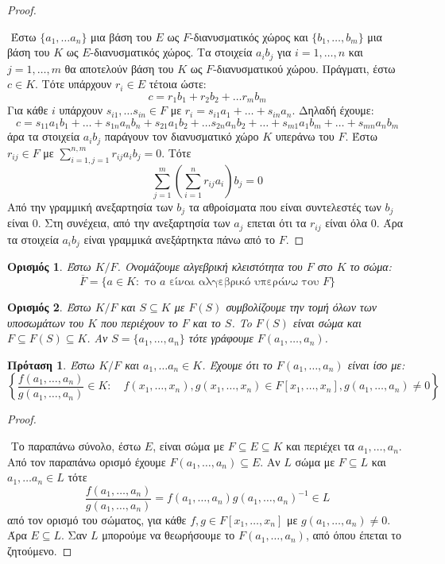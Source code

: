 \documentclass[oneside,a4paper]{article}
\newtheorem*{defn}{Ορισμός}
\newtheorem{prop}{Πρόταση}
\begin{document}
\begin{proof} $ $
	
	$ $\newline
	Έστω $\{a_1 , \ldots a_n\}$ μια βάση του $E$ ως $F$-διανυσματικός χώρος και $\{b_1,\ldots,b_m\}$ μια βάση του $K$ ως $E$-διανυσματικός χώρος. Τα στοιχεία $a_i b_j$ για $i=1,\ldots,n$ και $j=1,\ldots,m$ θα αποτελούν βάση του $K$ ως $F$-διανυσματικού χώρου. Πράγματι, έστω $c \in K$. Τότε υπάρχουν $r_i \in E$ τέτοια ώστε:
	$$c = r_1 b_1 + r_2 b_2 + \ldots r_m b_m$$
	Για κάθε $i$ υπάρχουν $s_{i1},\ldots s_{in} \in F$ με $r_i = s_{i1} a_1 + \ldots + s_{in} a_n$. Δηλαδή έχουμε:
	$$c = s_{11} a_1 b_1 + \ldots + s_{1n} a_n b_n + s_{21} a_1 b_2 + \ldots s_{2n} a_n b_2 + \ldots +s_{m1} a_1 b_m + \ldots + s_{mn} a_n b_m$$
	άρα τα στοιχεία $a_i b_j$ παράγουν τον διανυσματικό χώρο $K$ υπεράνω του $F$.
	Έστω $r_{ij} \in F$ με $\sum\limits_{i=1,j=1}^{n,m} r_{ij} a_i b_j = 0$. Τότε
	$$\sum\limits_{j=1}^m \left(\sum\limits_{i=1}^n r_{ij} a_i \right) b_j = 0$$
	Από την γραμμική ανεξαρτησία των $b_j$ τα αθροίσματα που είναι συντελεστές των $b_j$ είναι $0$. Στη συνέχεια, από την ανεξαρτησία των $a_j$ επεται ότι τα $r_{ij}$ είναι όλα $0$. Άρα τα στοιχεία $a_i b_j$ είναι γραμμικά ανεξάρτηκτα πάνω από το $F$.
\end{proof}
\vspace{0.1cm}
\begin{defn} Έστω $K/F$. Ονομάζουμε αλγεβρική κλειστότητα του $F$ στο $K$ το σώμα:
	$$\overline F = \{a \in K: \text{ το } a \text{ είναι αλγεβρικό υπεράνω του } F\}$$ 
\end{defn} %
\vspace{0.1cm}
\begin{defn} Έστω $K/F$ και $S\subseteq K$ με $F(S)$ συμβολίζουμε την τομή όλων των υποσωμάτων του $K$ που περιέχουν το $F$ και το $S$. To $F(S)$ είναι σώμα και $F\subseteq F(S) \subseteq K$. Αν $S=\{a_1, \ldots, a_n\}$ τότε γράφουμε $F(a_1, \ldots, a_n)$.

\end{defn}
\vspace{0.1cm}
\begin{prop} Έστω $K/F$ και $a_1,\ldots a_n \in K$. Έχουμε ότι το $F(a_1, \ldots , a_n)$  είναι ίσο με:
	$$ \left\{\frac{f(a_1,\ldots,a_n)}{g(a_1,\ldots, a_n)} \in K: \quad f(x_1,\ldots,x_n), g(x_1,\ldots,x_n) \in F[x_1,\ldots,x_n] , g(a_1,\ldots,a_n)\neq 0\right\}$$
\end{prop}

\begin{proof} $ $
	
	$ $\newline
	Το παραπάνω σύνολο, έστω $E$, είναι σώμα με $F\subseteq E \subseteq K$ και περιέχει τα $a_1, \ldots, a_n$. Από τον παραπάνω ορισμό έχουμε $F(a_1,\ldots,a_n)\subseteq E$.
	Αν $L$ σώμα με $F \subseteq L$ και $a_1, \ldots a_n \in L$ τότε 
	$$\frac{f(a_1, \ldots, a_n)}{g(a_1,\ldots,a_n)} = f(a_1, \ldots, a_n) {g(a_1, \ldots, a_n)}^{-1} \in L$$
	από τον ορισμό του σώματος, για κάθε $f,g \in F[x_1,\ldots,x_n]$ με $ g(a_1, \ldots, a_n) \neq 0$. Άρα $E \subseteq L$. Σαν $L$ μπορούμε να θεωρήσουμε το $F(a_1, \ldots, a_n)$, από όπου έπεται το ζητούμενο.
\end{proof}
\vspace{0.1cm}
\end{document}
